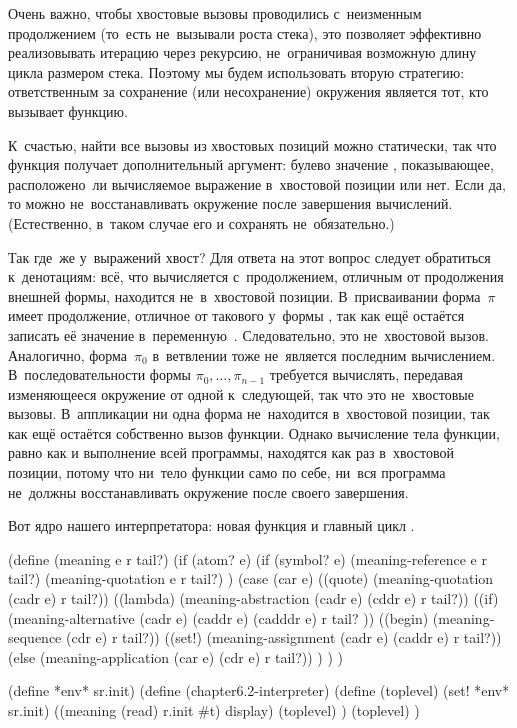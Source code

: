 Очень важно, чтобы хвостовые вызовы проводились с~неизменным продолжением
(то~есть не~вызывали роста стека), это позволяет эффективно реализовывать
итерацию через рекурсию, не~ограничивая возможную длину цикла размером стека.
Поэтому мы будем использовать вторую стратегию: ответственным за сохранение (или
несохранение) окружения является тот, кто вызывает функцию.

К~счастью, найти все вызовы из хвостовых позиций можно статически, так что
функция  получает дополнительный аргумент: булево значение
, показывающее, расположено~ли вычисляемое выражение в~хвостовой
позиции или нет. Если да, то можно не~восстанавливать окружение после завершения
вычислений. (Естественно, в~таком случае его и сохранять не~обязательно.)

Так где~же у~выражений хвост? Для ответа на этот вопрос следует обратиться
к~денотациям: всё, что вычисляется с~продолжением, отличным от продолжения
внешней формы, находится не~в~хвостовой позиции. В~присваивании  форма~$\pi$ имеет продолжение, отличное от такового у~формы ,
так как ещё остаётся записать её значение в~переменную~. Следовательно,
это не~хвостовой вызов. Аналогично, форма~$\pi_0$ в~ветвлении  тоже не~является последним вычислением. В~последовательности
 формы $\pi_0, \ldots, \pi_{n-1}$
требуется вычислять, передавая изменяющееся окружение от одной к~следующей, так
что это не~хвостовые вызовы. В~аппликации  ни одна
форма не~находится в~хвостовой позиции, так как ещё остаётся собственно вызов
функции. Однако вычисление тела функции, равно как и выполнение всей программы,
находятся как раз в~хвостовой позиции, потому что ни~тело функции само по себе,
ни~вся программа не~должны восстанавливать окружение после своего завершения.

Вот ядро нашего интерпретатора: новая функция  и главный цикл
.

\begin{code:lisp}[label=fast/reject/src:meaning]
(define (meaning e r tail?)
  (if (atom? e)
      (if (symbol? e) (meaning-reference e r tail?)
                      (meaning-quotation e r tail?) )
      (case (car e)
        ((quote)  (meaning-quotation (cadr e) r tail?))
        ((lambda) (meaning-abstraction (cadr e) (cddr e) r tail?))
        ((if)     (meaning-alternative (cadr e) (caddr e) (cadddr e)
                                       r tail? ))
        ((begin)  (meaning-sequence (cdr e) r tail?))
        ((set!)   (meaning-assignment (cadr e) (caddr e) r tail?))
        (else     (meaning-application (car e) (cdr e) r tail?)) ) ) )

(define *env* sr.init)
(define (chapter6.2-interpreter)
  (define (toplevel)
    (set! *env* sr.init)
    ((meaning (read) r.init #t) display)
    (toplevel) )
  (toplevel) )
\end{code:lisp}


